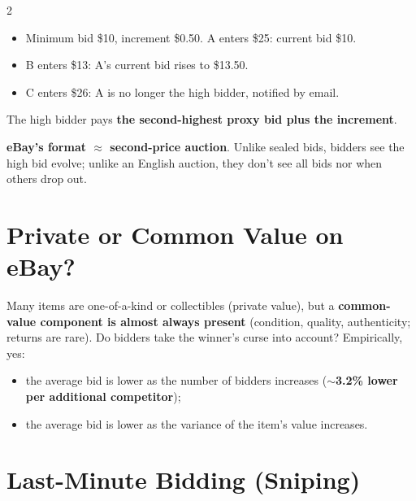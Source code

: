 \documentclass[a4paper,9pt]{extarticle}
\begin{document}
\begin{multicols}{2}
\begin{definition}
\begin{itemize}
\item Minimum bid \$10, increment \$0.50. A enters \$25: current bid \$10.

\item B enters \$13: A's current bid rises to \$13.50.

\item C enters \$26: A is no longer the high bidder, notified by email.

\end{itemize}

The high bidder pays \textbf{the second-highest proxy bid plus the increment}.

\end{definition}


\begin{important}

\textbf{eBay's format $\approx$ second-price auction}. Unlike sealed bids, bidders see the
high bid evolve; unlike an English auction, they don't see all bids nor when others drop out.

\end{important}



\section{Private or Common Value on eBay?}


Many items are one-of-a-kind or collectibles (private value), but a \textbf{common-value
component is almost always present} (condition, quality, authenticity; returns are rare).
Do bidders take the winner's curse into account? Empirically, yes:


\begin{itemize}

\item the average bid is lower as the number of bidders increases (\textbf{$\sim$3.2\% lower
per additional competitor});

\item the average bid is lower as the variance of the item's value increases.

\end{itemize}



\section{Last-Minute Bidding (Sniping)}



\end{multicols}
\end{document}
